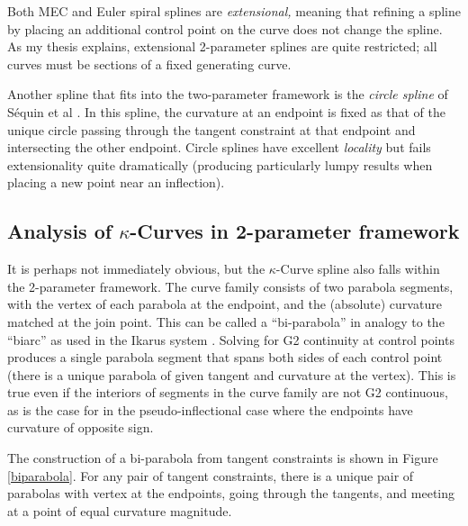 \documentclass{article}
\newcommand{\kcurve}{$\kappa$-Curve}
\begin{document}
Both MEC and Euler spiral splines are \emph{extensional,} meaning that refining a spline by placing an additional control point on the curve does not change the spline. As my thesis explains, extensional 2-parameter splines are quite restricted; all curves must be sections of a fixed generating curve.

Another spline that fits into the two-parameter framework is the \emph{circle spline} of S{\'e}quin et al \cite{DBLP:journals/cad/SequinLY05}. In this spline, the curvature at an endpoint is fixed as that of the unique circle passing through the tangent constraint at that endpoint and intersecting the other endpoint. Circle splines have excellent \emph{locality} but fails extensionality quite dramatically (producing particularly lumpy results when placing a new point near an inflection).

\subsection{Analysis of \kcurve{}s in 2-parameter framework}

It is perhaps not immediately obvious, but the \kcurve{} spline also falls within the 2-parameter framework. The curve family consists of two parabola segments, with the vertex of each parabola at the endpoint, and the (absolute) curvature matched at the join point. This can be called a ``bi-parabola'' in analogy to the ``biarc'' as used in the Ikarus system \cite{Karow87}. Solving for G2 continuity at control points produces a single parabola segment that spans both sides of each control point (there is a unique parabola of given tangent and curvature at the vertex). This is true even if the interiors of segments in the curve family are not G2 continuous, as is the case for in the pseudo-inflectional case where the endpoints have curvature of opposite sign.

The construction of a bi-parabola from tangent constraints is shown in Figure \ref{biparabola}. For any pair of tangent constraints, there is a unique pair of parabolas with vertex at the endpoints, going through the tangents, and meeting at a point of equal curvature magnitude.
\end{document}
